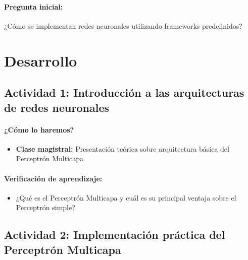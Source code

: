 \documentclass[a4,11pt]{aleph-notas}
\begin{document}
\paragraph{Pregunta inicial:} 
¿Cómo se implementan redes neuronales utilizando frameworks predefinidos?

\section*{Desarrollo}

\subsection*{Actividad 1: Introducción a las arquitecturas de redes neuronales}
\paragraph{¿Cómo lo haremos?}  
\begin{itemize}[leftmargin=*]
    \item \textbf{Clase magistral:} 
    Presentación teórica sobre arquitectura básica del Perceptrón Multicapa
\end{itemize}

\paragraph{Verificación de aprendizaje:}  
\begin{itemize}[leftmargin=*]
    \item ¿Qué es el Perceptrón Multicapa y cuál es su principal ventaja sobre el Perceptrón simple?
\end{itemize}

\subsection*{Actividad 2: Implementación práctica del Perceptrón Multicapa}
\end{document}
